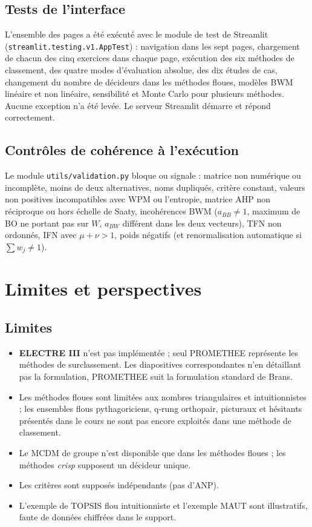 \documentclass[11pt,a4paper]{report}
\theoremstyle{definition}
\theoremstyle{remark}
\begin{document}
\section{Tests de l'interface}

L'ensemble des pages a été exécuté avec le module de test de Streamlit (\texttt{streamlit.testing.v1.AppTest}) :
navigation dans les sept pages, chargement de chacun des cinq exercices dans chaque page, exécution des six
méthodes de classement, des quatre modes d'évaluation absolue, des dix études de cas, changement du nombre
de décideurs dans les méthodes floues, modèles BWM linéaire et non linéaire, sensibilité et Monte Carlo
pour plusieurs méthodes. Aucune exception n'a été levée. Le serveur Streamlit démarre et répond
correctement.

\section{Contrôles de cohérence à l'exécution}

Le module \texttt{utils/validation.py} bloque ou signale : matrice non numérique ou incomplète, moins de
deux alternatives, noms dupliqués, critère constant, valeurs non positives incompatibles avec WPM ou
l'entropie, matrice AHP non réciproque ou hors échelle de Saaty, incohérences BWM ($a_{BB}\ne1$, maximum
de BO ne portant pas sur $W$, $a_{BW}$ différent dans les deux vecteurs), TFN non ordonnés, IFN avec
$\mu+\nu>1$, poids négatifs (et renormalisation automatique si $\sum w_j\ne1$).

\chapter{Limites et perspectives}\label{ch:limites}

\section{Limites}
\begin{itemize}
  \item \textbf{ELECTRE III} n'est pas implémentée ; seul PROMETHEE représente les méthodes de
        surclassement. Les diapositives correspondantes n'en détaillant pas la formulation, PROMETHEE suit
        la formulation standard de Brans.
  \item Les méthodes floues sont limitées aux nombres triangulaires et intuitionnistes ; les ensembles
        flous pythagoriciens, q-rung orthopair, picturaux et hésitants présentés dans le cours ne sont pas
        encore exploités dans une méthode de classement.
  \item Le MCDM de groupe n'est disponible que dans les méthodes floues ; les méthodes \emph{crisp}
        supposent un décideur unique.
  \item Les critères sont supposés indépendants (pas d'ANP).
  \item L'exemple de TOPSIS flou intuitionniste et l'exemple MAUT sont illustratifs, faute de données
        chiffrées dans le support.
\end{itemize}
\end{document}
